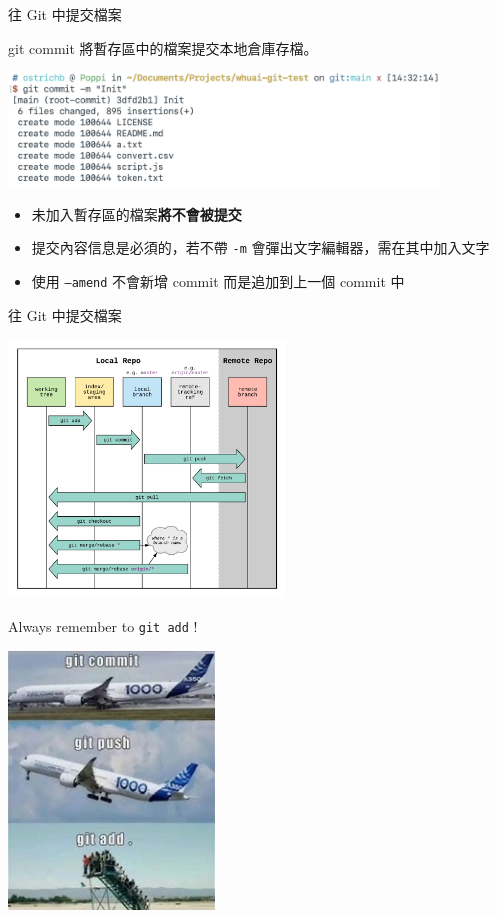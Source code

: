 \documentclass[xetex, unicode, 10pt, aspectratio=169]{beamer}
\begin{document}
\begin{frame}[fragile]{往 Git 中提交檔案}
    \begin{block}{git commit}
        將暫存區中的檔案提交本地倉庫存檔。
        \begin{center}
            \includegraphics[width=4.5in]{./img/git-commit.png}
        \end{center}
        \begin{itemize}
            \item 未加入暫存區的檔案\textbf{將不會被提交}
            \item 提交內容信息是必須的，若不帶 \texttt{-m} 會彈出文字編輯器，需在其中加入文字
            \item 使用 \texttt{--amend} 不會新增 commit 而是追加到上一個 commit 中
        \end{itemize}
    \end{block}
\end{frame}

\begin{frame}{往 Git 中提交檔案}
    \begin{center}
        \includegraphics[height=2.7in]{./img/git-workflow.png}
    \end{center}
\end{frame}

\begin{frame}{Always remember to \texttt{git add} !}
    \begin{center}
        \includegraphics[height=2.7in]{./img/always-remember-git-add.png}
    \end{center}
\end{frame}
\end{document}

